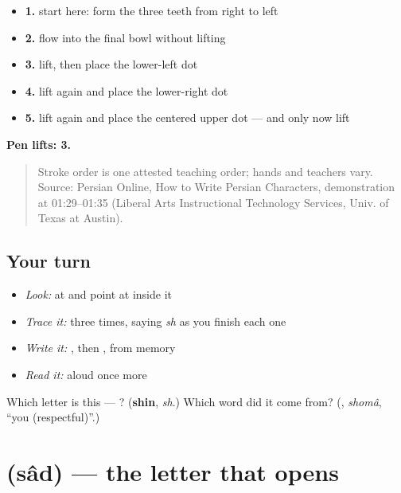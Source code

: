 \begin{itemize}
\raggedright
  \item \textbf{1.} start here: form the three teeth from right to left
  \item \textbf{2.} flow into the final bowl without lifting
  \item \textbf{3.} lift, then place the lower-left dot
  \item \textbf{4.} lift again and place the lower-right dot
  \item \textbf{5.} lift again and place the centered upper dot — and only now lift
\end{itemize}

\textbf{Pen lifts: 3.}

\begin{quote}
Stroke order is one attested teaching order; hands and teachers vary. Source: Persian Online, How to Write Persian Characters,  demonstration at 01:29–01:35 (Liberal Arts Instructional Technology Services, Univ. of Texas at Austin).
\end{quote}

\subsection*{Your turn}
\begin{itemize}
\raggedright
  \item \emph{Look:} at \textbf{} and point at  inside it
  \item \emph{Trace it:}  three times, saying \emph{sh} as you finish each one
  \item \emph{Write it:} , then , from memory
  \item \emph{Read it:} \textbf{} aloud once more
\end{itemize}

\begin{tcolorbox}[breakable,colback=teal!4,colframe=teal!35!black,title={Before you move on}]
Which letter is this — ? (\textbf{shin}, \emph{sh}.) Which word did it come from? (\textbf{}, \emph{shomâ}, \textquotedblleft{}you (respectful)\textquotedblright{}.)
\end{tcolorbox}
\section[\texorpdfstring{\fa{ص} (sâd)}{ص (sâd)}]{ (sâd) — the letter that opens }

\label{lesson:FA-W25-sad}



